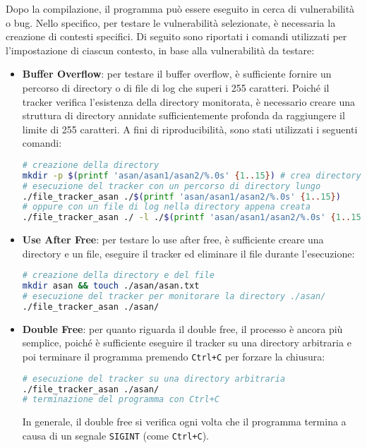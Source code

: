 Dopo la compilazione, il programma può essere eseguito in cerca di vulnerabilità
o bug. Nello specifico, per testare le vulnerabilità selezionate, è necessaria
la creazione di contesti specifici. Di seguito sono riportati i comandi utilizzati
per l'impostazione di ciascun contesto, in base alla vulnerabilità da testare:
\begin{itemize}
  \item \textbf{Buffer Overflow}: per testare il buffer overflow, è sufficiente
    fornire un percorso di directory o di file di log che superi i 255 caratteri.
    Poiché il tracker verifica l'esistenza della directory monitorata, è
    necessario creare una struttura di directory annidate sufficientemente
    profonda da raggiungere il limite di 255 caratteri. A fini di riproducibilità,
    sono stati utilizzati i seguenti comandi: \begin{lstlisting}[language=bash, numbers=none]
# creazione della directory
mkdir -p $(printf 'asan/asan1/asan2/%.0s' {1..15}) # crea directory annidate
# esecuzione del tracker con un percorso di directory lungo
./file_tracker_asan ./$(printf 'asan/asan1/asan2/%.0s' {1..15})
# oppure con un file di log nella directory appena creata
./file_tracker_asan ./ -l ./$(printf 'asan/asan1/asan2/%.0s' {1..15})logfile.log
    \end{lstlisting}

  \item \textbf{Use After Free}: per testare lo use after free, è sufficiente
    creare una directory e un file, eseguire il tracker ed eliminare il file durante
    l'esecuzione:
    \begin{lstlisting}[language=bash, numbers=none]
# creazione della directory e del file
mkdir asan && touch ./asan/asan.txt
# esecuzione del tracker per monitorare la directory ./asan/
./file_tracker_asan ./asan/
    \end{lstlisting}

  \item \textbf{Double Free}: per quanto riguarda il double free, il processo è
    ancora più semplice, poiché è sufficiente eseguire il tracker su una directory
    arbitraria e poi terminare il programma premendo \texttt{Ctrl+C} per forzare
    la chiusura: \begin{lstlisting}[language=bash, numbers=none]
# esecuzione del tracker su una directory arbitraria
./file_tracker_asan ./asan/
# terminazione del programma con Ctrl+C
    \end{lstlisting}
    In generale, il double free si verifica ogni volta che il programma termina
    a causa di un segnale \texttt{SIGINT} (come \texttt{Ctrl+C}).
\end{itemize}

